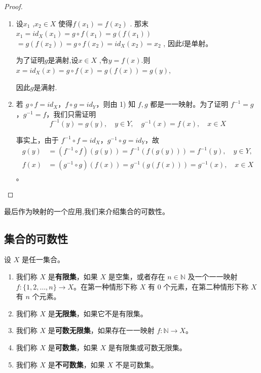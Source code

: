 \begin{proof}

\begin{enumerate}[label=\arabic*)]
\item 设\(x_1\) ,\(x_2 \in X\) 使得\(f(x_1) = f(x_2)\) . 那末\(x_1 = id_X(x_1) = g \circ f(x_1) = g(f(x_1))\)\(= g(f(x_2)) = g \circ f(x_2) = id_X(x_2) = x_2\) , 因此f是单射。

为了证明$g$是满射,设\(x \in X\) ,令$y = f(x)$.则\(x = id_X(x) = g \circ f(x) = g(f(x)) = g(y),\)

因此$g$是满射.

\item 若 $g \circ f = id_X$，$f \circ g = id_Y$，则由 1) 知 $f, g$ 都是一一映射。为了证明 $f^{-1} = g$，$g^{-1} = f$，我们只需证明
\[
f^{-1}(y) = g(y), \quad y \in Y, \quad g^{-1}(x) = f(x), \quad x \in X
\]

事实上，由于 $f^{-1} \circ f = id_X$，$g^{-1} \circ g = id_Y$，故
\begin{align*}
	g(y) &= (f^{-1} \circ f)(g(y)) = f^{-1}(f(g(y))) = f^{-1}(y), \quad y \in Y, \\
	f(x) &= (g^{-1} \circ g)(f(x)) = g^{-1}(g(f(x))) = g^{-1}(x), \quad x \in X
\end{align*}
。

\end{enumerate}
\end{proof}

最后作为映射的一个应用,我们来介绍集合的可数性。



\subsection{集合的可数性}
	\label{sec:1-3-4}

\begin{mydef*}{}

设 \(X\) 是任一集合。

\begin{enumerate}[label=\arabic*)]
	\item 我们称 \(X\) 是\textbf{有限集}，如果 \(X\) 是空集，或者存在 \(n \in \mathbb{N}\) 及一个一一映射 \(f: \{1, 2, \dots, n\} \to X\)。在第一种情形下称 \(X\) 有 0 个元素，在第二种情形下称 \(X\) 有 \(n\) 个元素。
	
	\item 我们称 \(X\) 是\textbf{无限集}，如果它不是有限集。
	
	\item 我们称 \(X\) 是\textbf{可数无限集}，如果存在一一映射 \(f: \mathbb{N} \to X\)。
	
	\item 我们称 \(X\) 是\textbf{可数集}，如果 \(X\) 是有限集或可数无限集。
	
	\item 我们称 \(X\) 是\textbf{不可数集}，如果 \(X\) 不是可数集。
\end{enumerate}

\end{mydef*}

